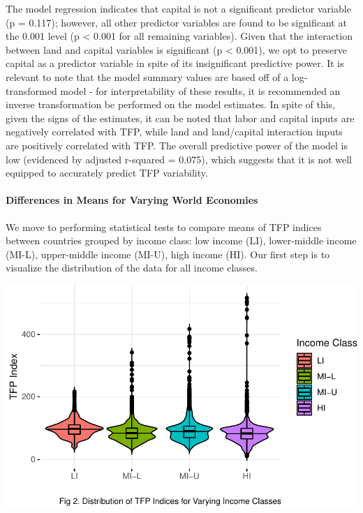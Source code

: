 \documentclass[
  letterpaper,
  DIV=11,
  numbers=noendperiod]{scrartcl}
\let\oldparagraph\paragraph
\renewcommand{\paragraph}[1]{\oldparagraph{#1}\mbox{}}
\begin{document}
The model regression indicates that capital is not a significant
predictor variable (p = 0.117); however, all other predictor variables
are found to be significant at the 0.001 level (p \textless{} 0.001 for
all remaining variables). Given that the interaction between land and
capital variables is significant (p \textless{} 0.001), we opt to
preserve capital as a predictor variable in spite of its insignificant
predictive power. It is relevant to note that the model summary values
are based off of a log-transformed model - for interpretability of these
results, it is recommended an inverse transformation be performed on the
model estimates. In spite of this, given the signs of the estimates, it
can be noted that labor and capital inputs are negatively correlated
with TFP, while land and land/capital interaction inputs are positively
correlated with TFP. The overall predictive power of the model is low
(evidenced by adjusted r-squared = 0.075), which suggests that it is not
well equipped to accurately predict TFP variability.

\hypertarget{differences-in-means-for-varying-world-economies}{%
\paragraph{Differences in Means for Varying World
Economies}\label{differences-in-means-for-varying-world-economies}}

We move to performing statistical tests to compare means of TFP indices
between countries grouped by income class: low income (LI), lower-middle
income (MI-L), upper-middle income (MI-U), high income (HI). Our first
step is to visualize the distribution of the data for all income
classes.

\includegraphics{Smith_Gabrielle_EDS222Final_files/figure-pdf/unnamed-chunk-4-1.pdf}
\end{document}

